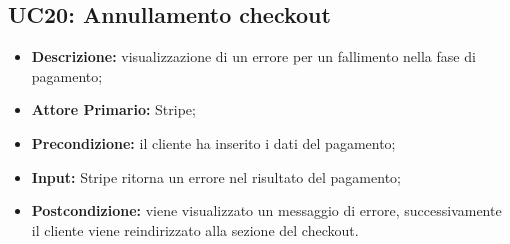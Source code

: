 \subsection{UC20: Annullamento checkout}
\label{sec:UC20}
\begin{itemize}
    \item \textbf{Descrizione:} visualizzazione di un errore per un fallimento nella fase di pagamento;
    \item \textbf{Attore Primario:} Stripe;
    \item \textbf{Precondizione:} il cliente ha inserito i dati del pagamento;
    \item \textbf{Input:} Stripe ritorna un errore nel risultato del pagamento;
    \item \textbf{Postcondizione:} viene visualizzato un messaggio di errore, successivamente il cliente viene reindirizzato alla sezione del checkout.
\end{itemize}
